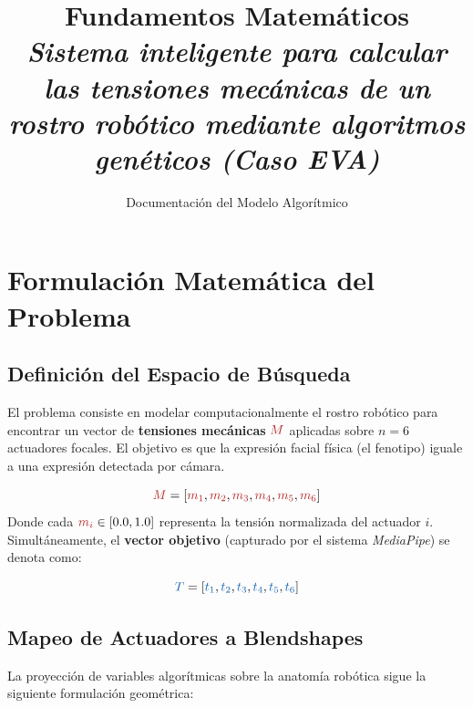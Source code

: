 \documentclass[11pt, a4paper]{article}
\title{\vspace{-2cm}\huge\textbf{Fundamentos Matemáticos}\\ \Large\textit{Sistema inteligente para calcular las tensiones mecánicas de un rostro robótico mediante algoritmos genéticos (Caso EVA)}}
\author{\normalsize Documentación del Modelo Algorítmico}
\date{}
\begin{document}
\maketitle
\thispagestyle{empty}

\tableofcontents
\vspace{1cm}

\section{Formulación Matemática del Problema}

\subsection{Definición del Espacio de Búsqueda}
El problema consiste en modelar computacionalmente el rostro robótico para encontrar un vector de \textbf{tensiones mecánicas} $\textcolor{corered}{M}$ aplicadas sobre $n = 6$ actuadores focales. El objetivo es que la expresión facial física (el fenotipo) iguale a una expresión detectada por cámara.

\begin{equation}
\textcolor{corered}{M} = [\textcolor{corered}{m_1}, \textcolor{corered}{m_2}, \textcolor{corered}{m_3}, \textcolor{corered}{m_4}, \textcolor{corered}{m_5}, \textcolor{corered}{m_6}]
\end{equation}
Donde cada $\textcolor{corered}{m_i} \in [0.0, 1.0]$ representa la tensión normalizada del actuador $i$. Simultáneamente, el \textbf{vector objetivo} (capturado por el sistema \textit{MediaPipe}) se denota como:

\begin{equation}
\textcolor{coreblue}{T} = [\textcolor{coreblue}{t_1}, \textcolor{coreblue}{t_2}, \textcolor{coreblue}{t_3}, \textcolor{coreblue}{t_4}, \textcolor{coreblue}{t_5}, \textcolor{coreblue}{t_6}]
\end{equation}

\subsection{Mapeo de Actuadores a Blendshapes}
La proyección de variables algorítmicas sobre la anatomía robótica sigue la siguiente formulación geométrica:
\end{document}
